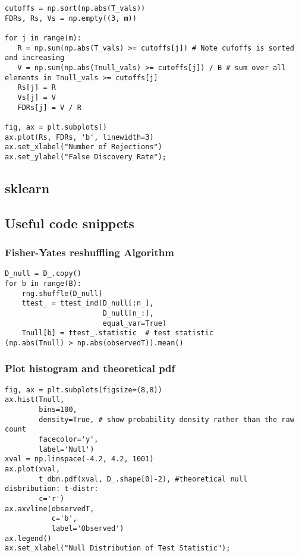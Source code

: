 \documentclass[
  letterpaper,
  DIV=11,
  numbers=noendperiod]{scrreprt}
\begin{document}
{{\begin{verbatim}
cutoffs = np.sort(np.abs(T_vals)) 
FDRs, Rs, Vs = np.empty((3, m))

for j in range(m):
   R = np.sum(np.abs(T_vals) >= cutoffs[j]) # Note cufoffs is sorted and increasing
   V = np.sum(np.abs(Tnull_vals) >= cutoffs[j]) / B # sum over all elements in Tnull_vals >= cutoffs[j]
   Rs[j] = R
   Vs[j] = V
   FDRs[j] = V / R
        
fig, ax = plt.subplots()
ax.plot(Rs, FDRs, 'b', linewidth=3)
ax.set_xlabel("Number of Rejections")
ax.set_ylabel("False Discovery Rate");        
\end{verbatim}

\subsection{sklearn}\label{sklearn-9}

\subsection{Useful code snippets}\label{useful-code-snippets-6}

\subsubsection{Fisher-Yates reshuffling
Algorithm}\label{fisher-yates-reshuffling-algorithm}

\begin{verbatim}
D_null = D_.copy()
for b in range(B):
    rng.shuffle(D_null)
    ttest_ = ttest_ind(D_null[:n_],
                       D_null[n_:],
                       equal_var=True)
    Tnull[b] = ttest_.statistic  # test statistic
(np.abs(Tnull) > np.abs(observedT)).mean()
\end{verbatim}

\subsubsection{Plot histogram and theoretical
pdf}\label{plot-histogram-and-theoretical-pdf}

\begin{verbatim}
fig, ax = plt.subplots(figsize=(8,8))
ax.hist(Tnull,
        bins=100,
        density=True, # show probability density rather than the raw count
        facecolor='y',
        label='Null')
xval = np.linspace(-4.2, 4.2, 1001)
ax.plot(xval,
        t_dbn.pdf(xval, D_.shape[0]-2), #theoretical null disbribution: t-distr: 
        c='r')
ax.axvline(observedT,
           c='b',
           label='Observed')
ax.legend()
ax.set_xlabel("Null Distribution of Test Statistic");
\end{verbatim}

}}
\end{document}
